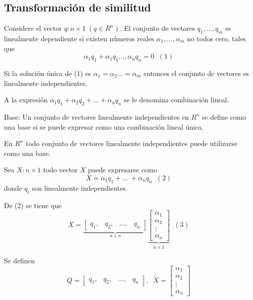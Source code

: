 \subsection{Transformación de similitud}
Considere el vector \( q:n \times 1\;(q\in R^n) \). El conjunto de vectores \( q_{1}, \ldots, q_{m} \) es linealmente dependiente si existen números reales \( \alpha_{1}, \ldots, \alpha_{m} \) no todos cero, tales que
\[
    \alpha_{1}q_{1} + \alpha_{1}q_{1} \ldots, \alpha_{n}q_{n} = 0 \;\; (1)
\]

Si la solución única de (1) es \( \alpha_{1}=\alpha_{2} \ldots =\alpha_{m} \) entonces el conjunto de vectores es linealmente independientes.

A la expresión \( \alpha_{1}q_{1}+\alpha_{2}q_{2}+ \ldots +\alpha_{n}q_{n} \) se le denomina combinación lineal.

Base: Un conjunto de vectores linealmente independientes en \( R^n \) se define como una base si se puede expresar como una combinación lineal única.

En \( R^n \) todo conjunto de vectores linealmente independientes puede utilizarse como una base.

Sea \( X:n \times 1 \) todo vector \( X \) puede expresarse como 
\[
    X=\alpha_{1}q_{1}+ \ldots\ +\alpha_{n}q_{n} \;\; (2)
\] 
donde \( q_{i} \) son linealmente independientes.

De (2) se tiene que
\[
    X=
    \underbrace{
        \begin{bmatrix}
            q_{1},& q_{2},& \ldots,& q_{n}
        \end{bmatrix}
                }_{n \times n}
    \underbrace{
        \begin{bmatrix}
            \alpha_{1} \\
            \alpha_{2} \\
            \vdots \\
            \alpha_{n}
        \end{bmatrix}
                }_{n\times 1} \;\; (3)
\]

Se definen
\[
    Q=
    \begin{bmatrix}
        q_{1},& q_{2},& \ldots,& q_{n}
    \end{bmatrix},\;\;
    \tilde{X}=
    \begin{bmatrix}
        \alpha_{1} \\
        \alpha_{2} \\
        \vdots \\
        \alpha_{n}
    \end{bmatrix}
\]

